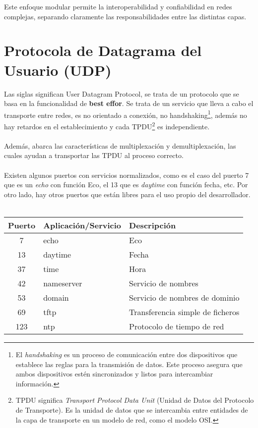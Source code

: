 \documentclass[a4paper,12pt]{article}
\begin{document}
Este enfoque modular permite la interoperabilidad y confiabilidad en redes complejas, separando claramente las responsabilidades entre las distintas capas.

\section{Protocola de Datagrama del Usuario (UDP)}

Las siglas significan User Datagram Protocol, se trata de un protocolo que se basa en la funcionalidad de \textbf{best effor}.
Se trata de un servicio que lleva a cabo el transporte entre redes, es no orientado a conexión, no handshaking\footnote{El \textit{handshaking} es un proceso de comunicación entre dos dispositivos que establece las reglas para la transmisión de datos. Este proceso asegura que ambos dispositivos estén sincronizados y listos para intercambiar información.}, además no hay retardos en el establecimiento y cada TPDU\footnote{TPDU significa \textit{Transport Protocol Data Unit} (Unidad de Datos del Protocolo de Transporte). Es la unidad de datos que se intercambia entre entidades de la capa de transporte en un modelo de red, como el modelo OSI.} es independiente.\\\\
Además, abarca las características de multiplexación y demultiplexación, las cuales ayudan a transportar las TPDU al proceso correcto.\\\\
Existen algunos puertos con servicios normalizados, como es el caso del puerto 7 que es un \textit{echo} con función Eco, el 13 que es \textit{daytime} con función fecha, etc. Por otro lado, hay otros puertos que están libres para el uso propio del desarrollador.\\\\
\begin{table}[H]
    \centering
    \begin{tabular}{|c|p{5cm}|p{5cm}|}
    \hline
    \textbf{Puerto} & \textbf{Aplicación/Servicio} & \textbf{Descripción} \\ \hline
    7 & echo & Eco \\ \hline
    13 & daytime & Fecha \\ \hline
    37 & time & Hora \\ \hline
    42 & nameserver & Servicio de nombres \\ \hline
    53 & domain & Servicio de nombres de dominio \\ \hline
    69 & tftp & Transferencia simple de ficheros \\ \hline
    123 & ntp & Protocolo de tiempo de red \\ \hline
    \end{tabular}
\end{table}
\end{document}
